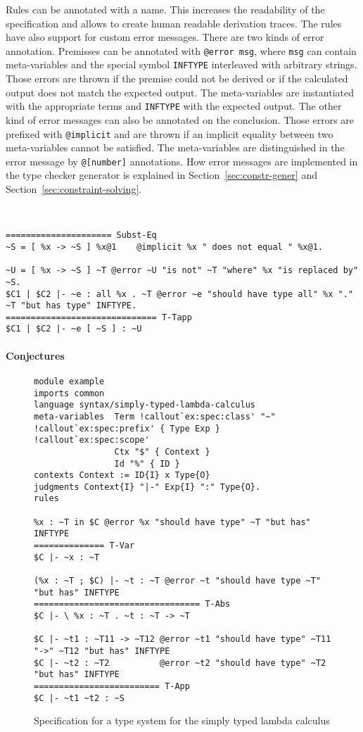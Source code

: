 Rules can be annotated with a name. This increases the readability of
the specification and allows to create human readable derivation
traces. The rules have also support for custom error messages. There
are two kinds of error annotation. Premisses can be annotated with
\verb|@error msg|, where \verb|msg| can contain meta-variables and the
special symbol \verb|INFTYPE| interleaved with arbitrary
strings. Those errors are thrown if the premise could not be derived
or if the calculated output does not match the expected output. The
meta-variables are instantiated with the appropriate terms and
\verb|INFTYPE| with the expected output. The other kind of error
messages can also be annotated on the conclusion. Those errors are
prefixed with \verb|@implicit| and are thrown if an implicit equality
between two meta-variables cannot be satisfied. The meta-variables are
distinguished in the error message by \verb|@[number]|
annotations. How error messages are implemented in the type checker
generator is explained in Section~\ref{sec:constr-gener} and
Section~\ref{sec:constraint-solving}.

\begin{example}{~}
\begin{verbatim}
===================== Subst-Eq
~S = [ %x -> ~S ] %x@1    @implicit %x " does not equal " %x@1.

~U = [ %x -> ~S ] ~T @error ~U "is not" ~T "where" %x "is replaced by" ~S.
$C1 | $C2 |- ~e : all %x . ~T @error ~e "should have type all" %x "." ~T "but has type" INFTYPE.
============================== T-Tapp
$C1 | $C2 |- ~e [ ~S ] : ~U
\end{verbatim}
\end{example}

\paragraph{Conjectures}

\begin{figure}
\scriptsize
\begin{verbatim}
module example
imports common
language syntax/simply-typed-lambda-calculus
meta-variables 	Term !callout`ex:spec:class' "~" !callout`ex:spec:prefix' { Type Exp } !callout`ex:spec:scope'
                Ctx "$" { Context }
                Id "%" { ID }
contexts Context := ID{I} x Type{O}
judgments Context{I} "|-" Exp{I} ":" Type{O}.
rules

%x : ~T in $C @error %x "should have type" ~T "but has" INFTYPE
============== T-Var
$C |- ~x : ~T

(%x : ~T ; $C) |- ~t : ~T @error ~t "should have type ~T" "but has" INFTYPE
================================= T-Abs
$C |- \ %x : ~T . ~t : ~T -> ~T

$C |- ~t1 : ~T11 -> ~T12 @error ~t1 "should have type" ~T11 "->" ~T12 "but has" INFTYPE
$C |- ~t2 : ~T2          @error ~t2 "should have type" ~T2 "but has" INFTYPE
========================= T-App
$C |- ~t1 ~t2 : ~S
\end{verbatim}
\caption{Specification for a type system for the simply typed lambda calculus}
\end{figure}

